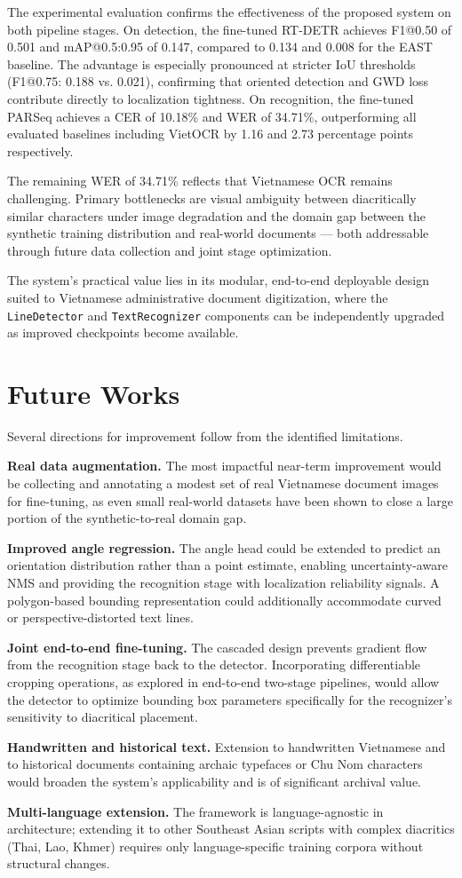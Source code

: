 The experimental evaluation confirms the effectiveness of the proposed system on both pipeline stages. On detection, the fine-tuned RT-DETR achieves F1@0.50 of 0.501 and mAP@0.5:0.95 of 0.147, compared to 0.134 and 0.008 for the EAST baseline. The advantage is especially pronounced at stricter IoU thresholds (F1@0.75: 0.188 vs. 0.021), confirming that oriented detection and GWD loss contribute directly to localization tightness. On recognition, the fine-tuned PARSeq achieves a CER of 10.18\% and WER of 34.71\%, outperforming all evaluated baselines including VietOCR by 1.16 and 2.73 percentage points respectively.

The remaining WER of 34.71\% reflects that Vietnamese OCR remains challenging. Primary bottlenecks are visual ambiguity between diacritically similar characters under image degradation and the domain gap between the synthetic training distribution and real-world documents — both addressable through future data collection and joint stage optimization.

The system's practical value lies in its modular, end-to-end deployable design suited to Vietnamese administrative document digitization, where the \texttt{LineDetector} and \texttt{TextRecognizer} components can be independently upgraded as improved checkpoints become available.

\section{Future Works}

Several directions for improvement follow from the identified limitations.

\textbf{Real data augmentation.} The most impactful near-term improvement would be collecting and annotating a modest set of real Vietnamese document images for fine-tuning, as even small real-world datasets have been shown to close a large portion of the synthetic-to-real domain gap.

\textbf{Improved angle regression.} The angle head could be extended to predict an orientation distribution rather than a point estimate, enabling uncertainty-aware NMS and providing the recognition stage with localization reliability signals. A polygon-based bounding representation could additionally accommodate curved or perspective-distorted text lines.

\textbf{Joint end-to-end fine-tuning.} The cascaded design prevents gradient flow from the recognition stage back to the detector. Incorporating differentiable cropping operations, as explored in end-to-end two-stage pipelines, would allow the detector to optimize bounding box parameters specifically for the recognizer's sensitivity to diacritical placement.

\textbf{Handwritten and historical text.} Extension to handwritten Vietnamese and to historical documents containing archaic typefaces or Chu Nom characters would broaden the system's applicability and is of significant archival value.

\textbf{Multi-language extension.} The framework is language-agnostic in architecture; extending it to other Southeast Asian scripts with complex diacritics (Thai, Lao, Khmer) requires only language-specific training corpora without structural changes.
